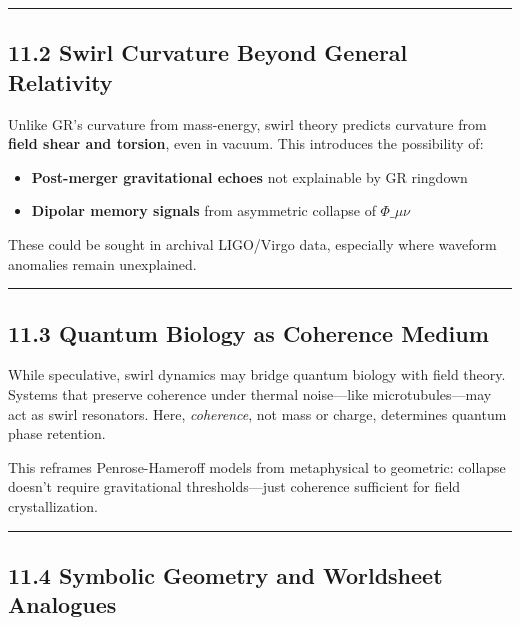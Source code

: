 \documentclass[
  11pt,
]{article}
\providecommand{\tightlist}{%
  \setlength{\itemsep}{0pt}\setlength{\parskip}{0pt}}
\begin{document}
\begin{center}\rule{0.5\linewidth}{0.5pt}\end{center}

\subsection{11.2 Swirl Curvature Beyond General
Relativity}\label{swirl-curvature-beyond-general-relativity}

Unlike GR's curvature from mass-energy, swirl theory predicts curvature
from \textbf{field shear and torsion}, even in vacuum. This introduces
the possibility of:

\begin{itemize}
\tightlist
\item
  \textbf{Post-merger gravitational echoes} not explainable by GR
  ringdown
\item
  \textbf{Dipolar memory signals} from asymmetric collapse of
  \(\Phi\_{\mu\nu}\)
\end{itemize}

These could be sought in archival LIGO/Virgo data, especially where
waveform anomalies remain unexplained.

\begin{center}\rule{0.5\linewidth}{0.5pt}\end{center}

\subsection{11.3 Quantum Biology as Coherence
Medium}\label{quantum-biology-as-coherence-medium}

While speculative, swirl dynamics may bridge quantum biology with field
theory. Systems that preserve coherence under thermal noise---like
microtubules---may act as swirl resonators. Here, \emph{coherence}, not
mass or charge, determines quantum phase retention.

This reframes Penrose-Hameroff models from metaphysical to geometric:
collapse doesn't require gravitational thresholds---just coherence
sufficient for field crystallization.

\begin{center}\rule{0.5\linewidth}{0.5pt}\end{center}

\subsection{11.4 Symbolic Geometry and Worldsheet
Analogues}\label{symbolic-geometry-and-worldsheet-analogues}
\end{document}
